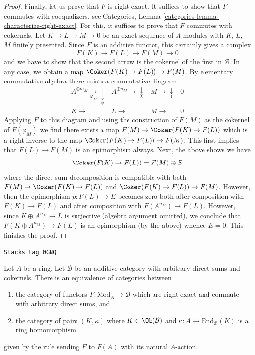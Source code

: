 \begin{proof}
\medskip\noindent
Finally, let us prove that $F$ is right exact. It suffices to show that $F$
commutes with coequalizers, see
Categories, Lemma \ref{categories-lemma-characterize-right-exact}.
For this, it suffices to prove that $F$ commutes with cokernels.
Let $K \to L \to M \to 0$ be an exact sequence of $A$-modules
with $K$, $L$, $M$ finitely presented. Since $F$ is an additive
functor, this certainly gives a complex
$$
F(K) \to F(L) \to F(M) \to 0
$$
and we have to show that the second arrow is the cokernel of the first
in $\mathcal{B}$. In any case, we obtain a map
$\Coker(F(K) \to F(L)) \to F(M)$.
By elementary commutative algebra there exists a commutative diagram
$$
\begin{array}{cccc}A^{\oplus m_M} \underset{\varphi_M}{\longrightarrow}\underset{\psi}{\downarrow} & A^{\oplus n_M} \longrightarrow\underset{\chi}{\downarrow} & M \longrightarrow\underset{1}{\downarrow} & 0 \\ K \longrightarrow & L \longrightarrow & M \longrightarrow & 0\end{array}
$$
Applying $F$ to this diagram and using the construction of $F(M)$ as
the cokernel of $F(\varphi_M)$ we find there exists a map
$F(M) \to \Coker(F(K) \to F(L))$ which is a right inverse
to the map $\Coker(F(K) \to F(L)) \to F(M)$. This first implies
that $F(L) \to F(M)$ is an epimorphism always. Next, the above shows
we have
$$
\Coker(F(K) \to F(L)) = F(M) \oplus E
$$
where the direct sum decomposition is compatible with both
$F(M) \to \Coker(F(K) \to F(L))$ and $\Coker(F(K) \to F(L)) \to F(M)$.
However, then the epimorphism $p : F(L) \to E$ becomes zero both
after composition with $F(K) \to F(L)$ and after composition
with $F(A^{n_M}) \to F(L)$. However, since $K \oplus A^{n_M} \to L$
is surjective (algebra argument omitted), we conclude that
$F(K \oplus A^{n_M}) \to F(L)$ is an epimorphism (by the above)
whence $E = 0$. This finishes the proof.
\end{proof}

\begin{lemma}
\label{functors-lemma-functor-on-modules}
\href{https://stacks.math.columbia.edu/tag/0GNQ}{\texttt{Stacks tag 0GNQ}}

Let $A$ be a ring. Let $\mathcal{B}$ be an additive category
with arbitrary direct sums and cokernels. There is an equivalence
of categories between
\begin{enumerate}
\item the category of functors $F : \text{Mod}_A \to \mathcal{B}$
which are right exact and commute with arbitrary direct sums, and
\item the category of pairs $(K, \kappa)$ where $K \in \Ob(\mathcal{B})$
and $\kappa : A \to \text{End}_\mathcal{B}(K)$ is a ring homomorphism
\end{enumerate}
given by the rule sending $F$ to $F(A)$ with its natural $A$-action.
\end{lemma}

